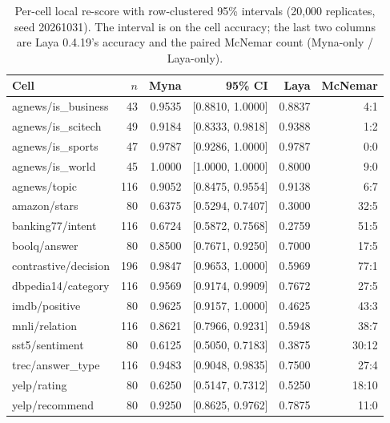 \begin{table}[t]
\centering
\small
\setlength{\tabcolsep}{4pt}
\caption{Per-cell local re-score with row-clustered 95\% intervals
(20{,}000 replicates, seed 20261031). The interval is on the cell accuracy;
the last two columns are Laya 0.4.19's accuracy and the paired McNemar count
(Myna-only / Laya-only).}
\label{tab:appendix_cells}
\begin{tabular}{lrrrrr}
\toprule
Cell & $n$ & Myna & 95\% CI & Laya & McNemar \\
\midrule
agnews/is\_business & 43 & 0.9535 & [0.8810, 1.0000] & 0.8837 & 4:1 \\
agnews/is\_scitech & 49 & 0.9184 & [0.8333, 0.9818] & 0.9388 & 1:2 \\
agnews/is\_sports & 47 & 0.9787 & [0.9286, 1.0000] & 0.9787 & 0:0 \\
agnews/is\_world & 45 & 1.0000 & [1.0000, 1.0000] & 0.8000 & 9:0 \\
agnews/topic & 116 & 0.9052 & [0.8475, 0.9554] & 0.9138 & 6:7 \\
amazon/stars & 80 & 0.6375 & [0.5294, 0.7407] & 0.3000 & 32:5 \\
banking77/intent & 116 & 0.6724 & [0.5872, 0.7568] & 0.2759 & 51:5 \\
boolq/answer & 80 & 0.8500 & [0.7671, 0.9250] & 0.7000 & 17:5 \\
contrastive/decision & 196 & 0.9847 & [0.9653, 1.0000] & 0.5969 & 77:1 \\
dbpedia14/category & 116 & 0.9569 & [0.9174, 0.9909] & 0.7672 & 27:5 \\
imdb/positive & 80 & 0.9625 & [0.9157, 1.0000] & 0.4625 & 43:3 \\
mnli/relation & 116 & 0.8621 & [0.7966, 0.9231] & 0.5948 & 38:7 \\
sst5/sentiment & 80 & 0.6125 & [0.5050, 0.7183] & 0.3875 & 30:12 \\
trec/answer\_type & 116 & 0.9483 & [0.9048, 0.9835] & 0.7500 & 27:4 \\
yelp/rating & 80 & 0.6250 & [0.5147, 0.7312] & 0.5250 & 18:10 \\
yelp/recommend & 80 & 0.9250 & [0.8625, 0.9762] & 0.7875 & 11:0 \\
\bottomrule
\end{tabular}
\end{table}
